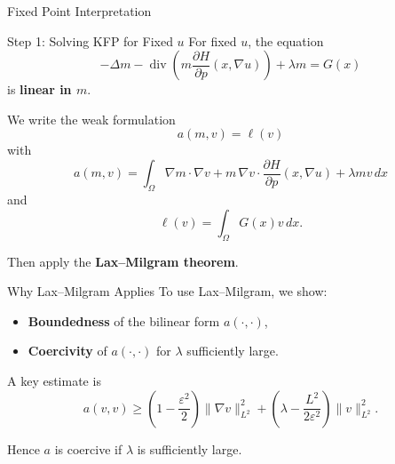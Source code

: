 \documentclass[aspectratio=169]{beamer}
\begin{document}
\begin{frame}{Fixed Point Interpretation}

\centering


\end{frame}
\begin{frame}{Step 1: Solving KFP for Fixed \(u\)}
For fixed \(u\), the equation
\[
-\Delta m - \operatorname{div}\!\left(m \frac{\partial H}{\partial p}(x,\nabla u)\right) + \lambda m = G(x)
\]
is \textbf{linear in \(m\)}.

\vspace{0.3cm}

We write the weak formulation
\[
a(m,v)=\ell(v)
\]
with
\[
a(m,v)=\int_\Omega \nabla m\cdot \nabla v
+ m\, \nabla v \cdot \frac{\partial H}{\partial p}(x,\nabla u)
+ \lambda mv \, dx
\]
and
\[
\ell(v)=\int_\Omega G(x)v\,dx.
\]

\vspace{0.3cm}

Then apply the \textbf{Lax--Milgram theorem}.
\end{frame}

\begin{frame}{Why Lax--Milgram Applies}
To use Lax--Milgram, we show:
\begin{itemize}
    \item \textbf{Boundedness} of the bilinear form \(a(\cdot,\cdot)\),
    \item \textbf{Coercivity} of \(a(\cdot,\cdot)\) for \(\lambda\) sufficiently large.
\end{itemize}

\vspace{0.4cm}

A key estimate is
\[
a(v,v)\ge
\left(1-\frac{\varepsilon^2}{2}\right)\|\nabla v\|_{L^2}^2
+
\left(\lambda-\frac{L^2}{2\varepsilon^2}\right)\|v\|_{L^2}^2.
\]

Hence \(a\) is coercive if \(\lambda\) is sufficiently large.
\end{frame}
\end{document}
